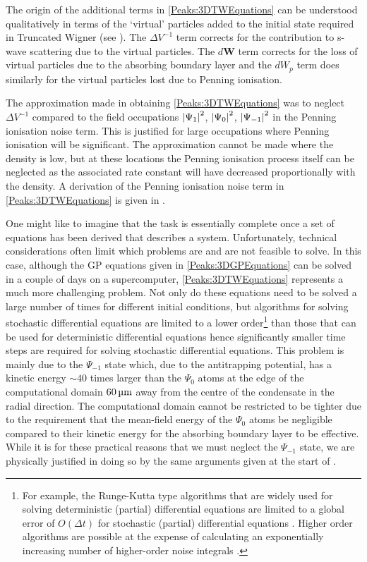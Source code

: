 The origin of the additional terms in \eqref{Peaks:3DTWEquations} can be understood qualitatively in terms of the `virtual' particles added to the initial state required in Truncated Wigner (see ). The $\Delta V^{-1}$ term corrects for the contribution to s-wave scattering due to the virtual particles. The $d \bm{W}$ term corrects for the loss of virtual particles due to the absorbing boundary layer and the $dW_p$ term does similarly for the virtual particles lost due to Penning ionisation.

The approximation made in obtaining \eqref{Peaks:3DTWEquations} was to neglect $\Delta V^{-1}$ compared to the field occupations $\left|\Psi_1\right|^2$, $\left|\Psi_0\right|^2$, $\left|\Psi_{-1}\right|^2$ in the Penning ionisation noise term. This is justified for large occupations where Penning ionisation will be significant. The approximation cannot be made where the density is low, but at these locations the Penning ionisation process itself can be neglected as the associated rate constant will have decreased proportionally with the density. A derivation of the Penning ionisation noise term in \eqref{Peaks:3DTWEquations} is given in .

\parasep

One might like to imagine that the task is essentially complete once a set of equations has been derived that describes a system. Unfortunately, technical considerations often limit which problems are and are not feasible to solve. In this case, although the GP equations given in \eqref{Peaks:3DGPEquations} can be solved in a couple of days on a supercomputer, \eqref{Peaks:3DTWEquations} represents a much more challenging problem. Not only do these equations need to be solved a large number of times for different initial conditions, but algorithms for solving stochastic differential equations are limited to a lower order\footnote{For example, the Runge-Kutta type algorithms that are widely used for solving deterministic (partial) differential equations are limited to a global error of $\displaystyle O(\Delta t)$ for stochastic (partial) differential equations \citep{Ruemelin:1982}. Higher order algorithms are possible at the expense of calculating an exponentially increasing number of higher-order noise integrals \citep{Burrage:2004}.} than those that can be used for deterministic differential equations hence significantly smaller time steps are required for solving stochastic differential equations. This problem is mainly due to the $\Psi_{-1}$ state which, due to the antitrapping potential, has a kinetic energy $\sim 40$ times larger than the $\Psi_{0}$ atoms at the edge of the computational domain $\unit[60]{\micro m}$ away from the centre of the condensate in the radial direction. The computational domain cannot be restricted to be tighter due to the requirement that the mean-field energy of the $\Psi_{0}$ atoms be negligible compared to their kinetic energy for the absorbing boundary layer to be effective. While it is for these practical reasons that we must neglect the $\Psi_{-1}$ state, we are physically justified in doing so by the same arguments given at the start of .

